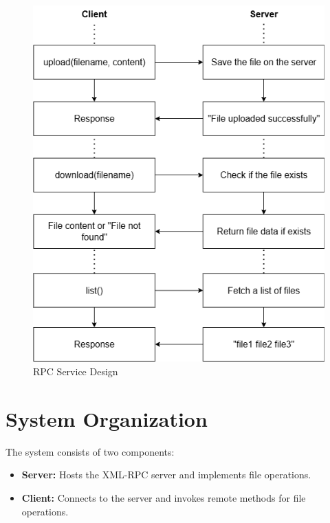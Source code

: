\documentclass[a4paper,12pt]{article}
\begin{document}
\begin{figure}[h]
    \centering
    \includegraphics[width=\textwidth]{rpc_design.png}
    \caption{RPC Service Design}
    \label{fig:rpc}
\end{figure}

\section*{System Organization}
The system consists of two components:
\begin{itemize}
    \item \textbf{Server:} Hosts the XML-RPC server and implements file operations.
    \item \textbf{Client:} Connects to the server and invokes remote methods for file operations.
\end{itemize}
\end{document}
